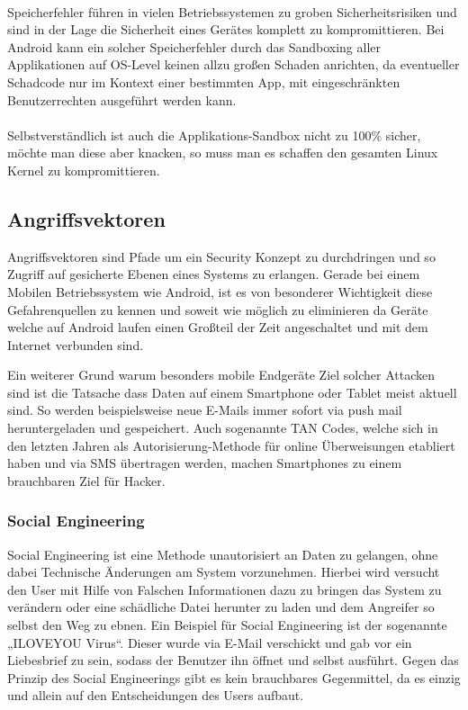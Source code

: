 \paragraph*{}
Speicherfehler führen in vielen Betriebssystemen zu groben Sicherheitsrisiken und sind in der Lage die Sicherheit eines Gerätes komplett zu kompromittieren. Bei Android kann ein solcher Speicherfehler durch das Sandboxing aller Applikationen auf OS-Level keinen allzu großen Schaden anrichten, da eventueller Schadcode nur im Kontext einer bestimmten App, mit eingeschränkten Benutzerrechten ausgeführt werden kann.
\paragraph*{}
Selbstverständlich ist auch die Applikations-Sandbox nicht zu 100\% sicher, möchte man diese aber knacken, so muss man es schaffen den gesamten Linux Kernel zu kompromittieren.
	
\subsection{Angriffsvektoren}
Angriffsvektoren sind Pfade um ein Security Konzept zu durchdringen und so Zugriff auf gesicherte Ebenen eines Systems zu erlangen. Gerade bei einem Mobilen Betriebssystem wie Android, ist es von besonderer Wichtigkeit diese Gefahrenquellen zu kennen und soweit wie möglich zu eliminieren da Geräte welche auf Android laufen einen Großteil der Zeit angeschaltet und mit dem Internet verbunden sind. \par
Ein weiterer Grund warum besonders mobile Endgeräte Ziel solcher Attacken sind ist die Tatsache dass Daten auf einem Smartphone oder Tablet meist aktuell sind. So werden beispielsweise neue E-Mails immer sofort via push mail heruntergeladen und gespeichert. Auch sogenannte TAN Codes, welche sich in den letzten Jahren als Autorisierung-Methode für online Überweisungen etabliert haben und via SMS übertragen werden, machen Smartphones zu einem brauchbaren Ziel für Hacker.
\subsubsection{Social Engineering}
Social Engineering ist eine Methode unautorisiert an Daten zu gelangen, ohne dabei Technische Änderungen am System vorzunehmen. Hierbei wird versucht den User mit Hilfe von Falschen Informationen dazu zu bringen das System zu verändern oder eine schädliche Datei herunter zu laden und dem Angreifer so selbst den Weg zu ebnen. Ein Beispiel für Social Engineering ist der sogenannte „ILOVEYOU Virus“. Dieser wurde via E-Mail verschickt und gab vor ein Liebesbrief zu sein, sodass der Benutzer ihn öffnet und selbst ausführt.
Gegen das Prinzip des Social Engineerings gibt es kein brauchbares Gegenmittel, da es einzig und allein auf den Entscheidungen des Users aufbaut.
